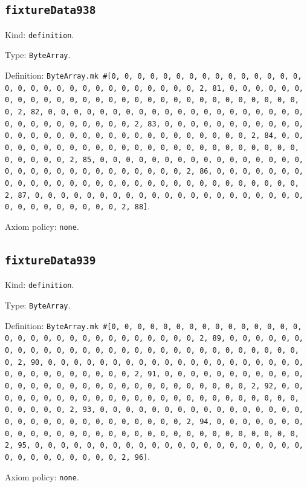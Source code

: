 \documentclass[11pt]{article}
\begin{document}
\subsection*{\texttt{fixtureData938}}
\noindent Kind: \texttt{definition}.\par
\noindent Type: \texttt{ByteArray}.\par
\noindent Definition: \texttt{ByteArray.mk \#[0, 0, 0, 0, 0, 0, 0, 0, 0, 0, 0, 0, 0, 0, 0, 0, 0, 0, 0, 0, 0, 0, 0, 0, 0, 0, 0, 0, 0, 0, 2, 81, 0, 0, 0, 0, 0, 0, 0, 0, 0, 0, 0, 0, 0, 0, 0, 0, 0, 0, 0, 0, 0, 0, 0, 0, 0, 0, 0, 0, 0, 0, 2, 82, 0, 0, 0, 0, 0, 0, 0, 0, 0, 0, 0, 0, 0, 0, 0, 0, 0, 0, 0, 0, 0, 0, 0, 0, 0, 0, 0, 0, 0, 0, 2, 83, 0, 0, 0, 0, 0, 0, 0, 0, 0, 0, 0, 0, 0, 0, 0, 0, 0, 0, 0, 0, 0, 0, 0, 0, 0, 0, 0, 0, 0, 0, 2, 84, 0, 0, 0, 0, 0, 0, 0, 0, 0, 0, 0, 0, 0, 0, 0, 0, 0, 0, 0, 0, 0, 0, 0, 0, 0, 0, 0, 0, 0, 0, 2, 85, 0, 0, 0, 0, 0, 0, 0, 0, 0, 0, 0, 0, 0, 0, 0, 0, 0, 0, 0, 0, 0, 0, 0, 0, 0, 0, 0, 0, 0, 0, 2, 86, 0, 0, 0, 0, 0, 0, 0, 0, 0, 0, 0, 0, 0, 0, 0, 0, 0, 0, 0, 0, 0, 0, 0, 0, 0, 0, 0, 0, 0, 0, 2, 87, 0, 0, 0, 0, 0, 0, 0, 0, 0, 0, 0, 0, 0, 0, 0, 0, 0, 0, 0, 0, 0, 0, 0, 0, 0, 0, 0, 0, 0, 0, 2, 88]}.\par
\noindent Axiom policy: \texttt{none}.\par
\subsection*{\texttt{fixtureData939}}
\noindent Kind: \texttt{definition}.\par
\noindent Type: \texttt{ByteArray}.\par
\noindent Definition: \texttt{ByteArray.mk \#[0, 0, 0, 0, 0, 0, 0, 0, 0, 0, 0, 0, 0, 0, 0, 0, 0, 0, 0, 0, 0, 0, 0, 0, 0, 0, 0, 0, 0, 0, 2, 89, 0, 0, 0, 0, 0, 0, 0, 0, 0, 0, 0, 0, 0, 0, 0, 0, 0, 0, 0, 0, 0, 0, 0, 0, 0, 0, 0, 0, 0, 0, 2, 90, 0, 0, 0, 0, 0, 0, 0, 0, 0, 0, 0, 0, 0, 0, 0, 0, 0, 0, 0, 0, 0, 0, 0, 0, 0, 0, 0, 0, 0, 0, 2, 91, 0, 0, 0, 0, 0, 0, 0, 0, 0, 0, 0, 0, 0, 0, 0, 0, 0, 0, 0, 0, 0, 0, 0, 0, 0, 0, 0, 0, 0, 0, 2, 92, 0, 0, 0, 0, 0, 0, 0, 0, 0, 0, 0, 0, 0, 0, 0, 0, 0, 0, 0, 0, 0, 0, 0, 0, 0, 0, 0, 0, 0, 0, 2, 93, 0, 0, 0, 0, 0, 0, 0, 0, 0, 0, 0, 0, 0, 0, 0, 0, 0, 0, 0, 0, 0, 0, 0, 0, 0, 0, 0, 0, 0, 0, 2, 94, 0, 0, 0, 0, 0, 0, 0, 0, 0, 0, 0, 0, 0, 0, 0, 0, 0, 0, 0, 0, 0, 0, 0, 0, 0, 0, 0, 0, 0, 0, 2, 95, 0, 0, 0, 0, 0, 0, 0, 0, 0, 0, 0, 0, 0, 0, 0, 0, 0, 0, 0, 0, 0, 0, 0, 0, 0, 0, 0, 0, 0, 0, 2, 96]}.\par
\noindent Axiom policy: \texttt{none}.\par
\end{document}
